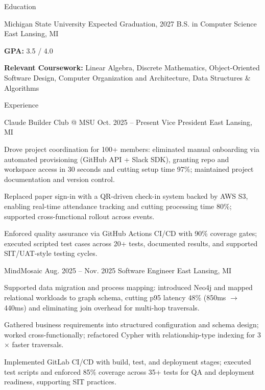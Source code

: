 \documentclass[
	11pt
]{../../../resume}
\begin{document}
	\begin{rSection}{E}{ducation}
		\begin{rSectionEntry}
			{Michigan State University}
			{Expected Graduation, 2027}
			{B.S. in Computer Science}
			{}
			{East Lansing, MI}

			\item \textbf{GPA:} 3.5 / 4.0
			\item \textbf{Relevant Coursework:} Linear Algebra, Discrete Mathematics, Object-Oriented Software Design, Computer Organization and Architecture, Data Structures \& Algorithms
		\end{rSectionEntry}
	\end{rSection}

	\begin{rSection}{E}{xperience}
		\begin{rSectionEntry}
			{Claude Builder Club @ MSU}
			{Oct. 2025 -- Present}
			{Vice President}
			{}
			{East Lansing, MI}

			\item Drove project coordination for 100+ members: eliminated manual onboarding via automated provisioning (GitHub API + Slack SDK), granting repo and workspace access in 30 seconds and cutting setup time 97\%; maintained project documentation and version control.
			\item Replaced paper sign-in with a QR-driven check-in system backed by AWS S3, enabling real-time attendance tracking and cutting processing time 80\%; supported cross-functional rollout across events.
			\item Enforced quality assurance via GitHub Actions CI/CD with 90\% coverage gates; executed scripted test cases across 20+ tests, documented results, and supported SIT/UAT-style testing cycles.
		\end{rSectionEntry}

		\begin{rSectionEntry}
			{MindMosaic}
			{Aug. 2025 -- Nov. 2025}
			{Software Engineer}
			{}
			{East Lansing, MI}

			\item Supported data migration and process mapping: introduced Neo4j and mapped relational workloads to graph schema, cutting p95 latency 48\% (850ms $\rightarrow$ 440ms) and eliminating join overhead for multi-hop traversals.
			\item Gathered business requirements into structured configuration and schema design; worked cross-functionally; refactored Cypher with relationship-type indexing for 3$\times$ faster traversals.
			\item Implemented GitLab CI/CD with build, test, and deployment stages; executed test scripts and enforced 85\% coverage across 35+ tests for QA and deployment readiness, supporting SIT practices.
		\end{rSectionEntry}
	\end{rSection}
\end{document}
